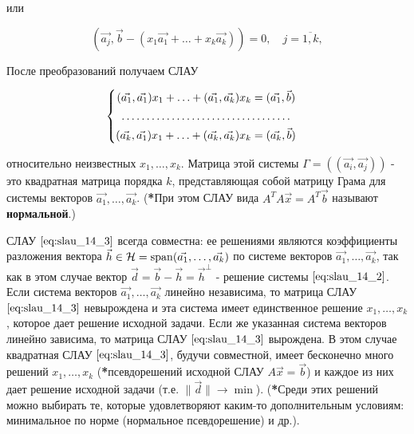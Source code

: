 или

$$(\vec{a_j}, \vec{b} - (x_1\vec{a_1} + \ldots + x_k\vec{a_k})) = 0, \quad j = \overline{1, k},$$

\bigbreak

После преобразований получаем СЛАУ

\begin{equation}
    \begin{cases}
        \begin{aligned}
            (\vec{a_1}, \vec{a_1}) x_1 + \ldots + (\vec{a_1}, \vec{a_k})x_k &= (\vec{a_1}, \vec{b}) \\
            \hdotsfor{2} \\
            (\vec{a_k}, \vec{a_1}) x_1 + \ldots + (\vec{a_k}, \vec{a_k})x_k &= (\vec{a_k}, \vec{b}) \\
        \end{aligned}
    \end{cases}
    \label{eq:slau_14_3}
\end{equation}

относительно неизвестных $x_1, \ldots, x_k$. Матрица этой системы $\Gamma = ((\vec{a_i}, \vec{a_j}))$ - это квадратная матрица порядка $k$, представляющая собой матрицу Грама для системы векторов $\vec{a_1}, \ldots, \vec{a_k}$. (\textbf{*}При этом СЛАУ вида $A^TA\vec{x} = A^T\vec{b}$ называют \textbf{нормальной}.)

СЛАУ $\eqref{eq:slau_14_3}$ всегда совместна: ее решениями являются коэффициенты разложения вектора $\vec{h} \in \mathcal{H} = \operatorname{\mathop{\mathrm{span}}}(\vec{a_1}, \ldots, \vec{a_k})$ по системе векторов $\vec{a_1}, \ldots, \vec{a_k}$, так как в этом случае вектор $\vec{d} = \vec{b} - \vec{h} = \vec{h}^\perp$ - решение системы $\eqref{eq:slau_14_2}$. Если система векторов $\vec{a_1}, \ldots, \vec{a_k}$ линейно независима, то матрица СЛАУ $\eqref{eq:slau_14_3}$ невырождена и эта система имеет единственное решение $x_1, \ldots, x_k$, которое дает решение исходной задачи. Если же указанная система векторов линейно зависима, то матрица СЛАУ $\eqref{eq:slau_14_3}$ вырождена. В этом случае квадратная СЛАУ $\eqref{eq:slau_14_3}$, будучи совместной, имеет бесконечно много решений $x_1, \ldots, x_k$ (\textbf{*}псевдорешений исходной СЛАУ $A\vec{x} = \vec{b}$) и каждое из них дает решение исходной задачи (т.е. $\lVert \vec{d} \rVert \to \min$). (\textbf{*}Среди этих решений можно выбирать те, которые удовлетворяют каким-то дополнительным условиям: минимальное по норме (нормальное псевдорешение) и др.).

\bigbreak

